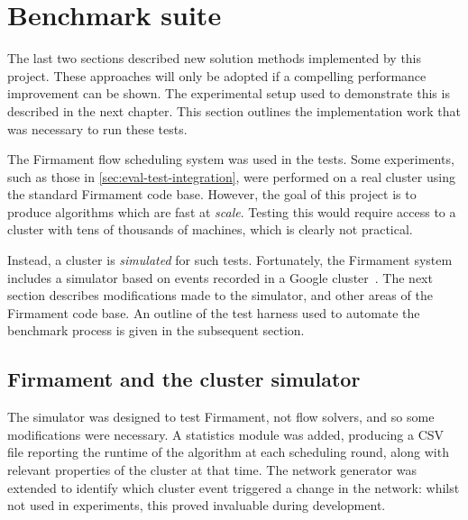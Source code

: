\section{Benchmark suite} \label{sec:impl-benchmark}

The last two sections described new solution methods implemented by this project. These approaches will only be adopted if a compelling performance improvement can be shown. The experimental setup used to demonstrate this is described in the next chapter. This section outlines the implementation work that was necessary to run these tests.

The Firmament flow scheduling system was used in the tests. Some experiments, such as those in \cref{sec:eval-test-integration}, were performed on a real cluster using the standard Firmament code base. However, the goal of this project is to produce algorithms which are fast at \emph{scale}. Testing this would require access to a cluster with tens of thousands of machines, which is clearly not practical.

Instead, a cluster is \emph{simulated} for such tests. Fortunately, the Firmament system includes a simulator based on events recorded in a Google cluster~\cite{clusterdata:Wilkes2011}. The next section describes modifications made to the simulator, and other areas of the Firmament code base. An outline of the test harness used to automate the benchmark process is given in the subsequent section.

\subsection{Firmament and the cluster simulator} \label{sec:impl-benchmark-simulator}

The simulator was designed to test Firmament, not flow solvers, and so some modifications were necessary. A statistics module was added, producing a CSV file reporting the runtime of the algorithm at each scheduling round, along with relevant properties of the cluster at that time. The network generator was extended to identify which cluster event triggered a change in the network: whilst not used in experiments, this proved invaluable during development.


